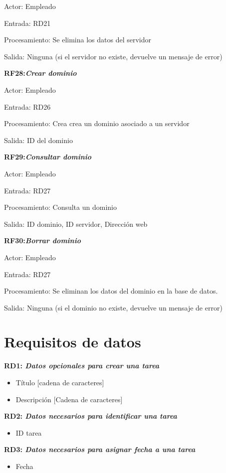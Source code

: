 \documentclass[paper=a4, fontsize=11pt, spanish]{scrartcl}
\begin{document}
Actor: Empleado

Entrada: RD21

Procesamiento: Se elimina los datos del servidor

Salida: Ninguna  (si el servidor no existe, devuelve un mensaje de error)

\setlength{\parindent}{0em}
\textbf{RF28:\textit{Crear dominio}}
\setlength{\parindent}{3em}

Actor: Empleado

Entrada: RD26

Procesamiento: Crea crea un dominio asociado a un servidor

Salida: ID del dominio

\setlength{\parindent}{0em}
\textbf{RF29:\textit{Consultar dominio}}
\setlength{\parindent}{3em}

Actor: Empleado

Entrada: RD27

Procesamiento: Consulta un dominio

Salida: ID dominio, ID servidor, Dirección web

\setlength{\parindent}{0em}
\textbf{RF30:\textit{Borrar dominio}}
\setlength{\parindent}{3em}

Actor: Empleado

Entrada: RD27

Procesamiento: Se eliminan los datos del dominio en la base de datos.

Salida: Ninguna  (si el dominio no existe, devuelve un mensaje de error)

\section{Requisitos de datos}
\setlength{\parindent}{0em}
\textbf{RD1: \textit{Datos opcionales para crear una tarea}}
\setlength{\parindent}{2em}
\begin{itemize}
\item Título [cadena de caracteres]
\item Descripción [Cadena de caracteres]
\end{itemize}

\setlength{\parindent}{0em}
\textbf{RD2: \textit{Datos necesarios para identificar una tarea}}
\setlength{\parindent}{2em}
\begin{itemize}
\item ID tarea
\end{itemize}

\setlength{\parindent}{0em}
\textbf{RD3: \textit{Datos necesarios para asignar fecha a una tarea}}
\setlength{\parindent}{2em}
\begin{itemize}
\item Fecha
\end{itemize}
\end{document}
